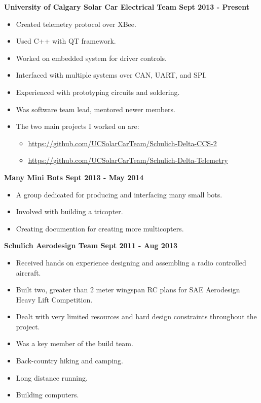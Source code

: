 \documentclass[12pt]{article} %
\begin{document}
\noindent \centerline{\bf University of Calgary Solar Car Electrical Team \hfill Sept 2013 - Present}
\begin{itemize}
  \item Created telemetry protocol over XBee.
  \item Used C++ with QT framework. 
  \item Worked on embedded system for driver controls.
  \item Interfaced with multiple systems over CAN, UART, and SPI.
  \item Experienced with prototyping circuits and soldering.
  \item Was software team lead, mentored newer members.
  \item The two main projects I worked on are:
\begin{itemize}
  \item \url{https://github.com/UCSolarCarTeam/Schulich-Delta-CCS-2}
  \item \url{https://github.com/UCSolarCarTeam/Schulich-Delta-Telemetry}
\end{itemize}
\end{itemize}

\noindent \centerline{\bf Many Mini Bots \hfill Sept 2013 - May 2014}
\begin{itemize}
  \item A group dedicated for producing and interfacing many small bots.
  \item Involved with building a tricopter.
  \item Creating documention for creating more multicopters.
\end{itemize}

\noindent \centerline{ \bf Schulich Aerodesign Team \hfill Sept 2011 - Aug 2013}
\begin{itemize}
  \item Received hands on experience  designing and assembling a radio controlled aircraft.
  \item Built two, greater than 2 meter wingspan RC plans for SAE Aerodesign Heavy Lift Competition.
  \item Dealt with very limited resources and hard design constraints throughout the project.
  \item Was a key member of the build team.
\end{itemize}

\bigskip
{}
\medskip
\begin{itemize}
\item Back-country hiking and camping.
\item Long distance running.
\item Building computers.
\end{itemize}
\bigskip
\end{document}
